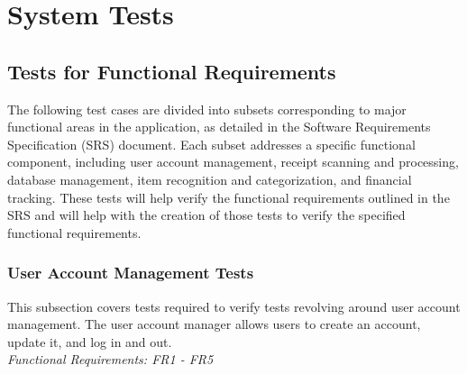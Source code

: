 \documentclass[12pt, titlepage]{article}
\begin{document}





\section{System Tests}

\subsection{Tests for Functional Requirements}

The following test cases are divided into subsets corresponding to major functional areas in the application, as detailed in the Software Requirements Specification (SRS) document. 
Each subset addresses a specific functional component, including user account management, receipt scanning and processing, database management, item recognition and categorization, and financial tracking. 
These tests will help verify the functional requirements outlined in the SRS and will help with the creation of those tests to verify the specified functional requirements.

\subsubsection{User Account Management Tests}

This subsection covers tests required to verify tests revolving around user account management. The user account manager allows users to create an account, update it, and log in and out.\\
\textit{Functional Requirements: FR1 - FR5}
\end{document}
